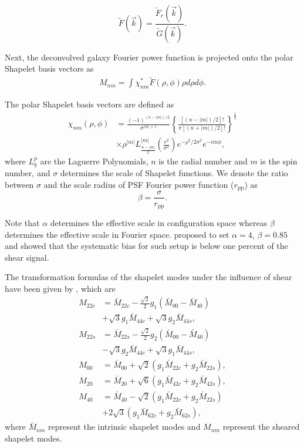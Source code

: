 \documentclass[a4paper,fleqn,usenatbib]{mnras}
\begin{document}
\begin{equation}\label{PSF deconvolution_fourier}
\tilde{F}(\vec{k})=\frac{\tilde{F}_r(\vec{k})}{\tilde{G}(\vec{k})}.
\end{equation}

Next, the deconvolved galaxy Fourier power function is projected onto the polar
Shapelet basis vectors \citep{polar_Shapelets} as
\begin{align}\label{Shapelets_decompose}
M_{nm}=\int \chi_{nm}^{*} \tilde{F}(\rho,\phi) \rho d\rho d\phi.
\end{align}

The polar Shapelet basis vectors are defined as
\begin{align*}
\chi_{nm}(\rho,\phi)&=\frac{(-1)^{(n-|m|)/2}}{\sigma^{|m|+1}}\left\lbrace
    \frac{[(n-|m|)/2]!}{\pi[(n+|m|)/2]!}\right\rbrace^\frac{1}{2}\\
    &\times
    \rho^{|m|}L^{|m|}_{\frac{n-|m|}{2}}\left(\frac{r^2}{\sigma^2}\right)e^{-\rho^2/2\sigma^2}
    e^{-im\phi},
\end{align*}
where $L^{p}_{q}$ are the Laguerre Polynomials, $n$ is the radial number and
$m$ is the spin number, and $\sigma$ determines the scale of Shapelet
functions. We denote the ratio between $\sigma$ and the scale radius of PSF
Fourier power function ($r_{\text{pp}}$) as \citep{Li18FPFS}
\begin{equation}
\beta=\frac{\sigma}{r_{\text{pp}}}.
\end{equation}

Note that $\alpha$ determines the effective scale in configuration space
whereas $\beta$ determines the effective scale in Fourier space.
\citet{Li18FPFS} proposed to set $\alpha=4$, $\beta=0.85$ and showed that the
systematic bias for such setup is below one percent of the shear signal.


The transformation formulas of the shapelet modes under the influence of shear
have been given by \citet{polar_Shapelets}, which are
\begin{equation}\label{Shapelets_Moments_shear_Transform}
\begin{split}
M_{22c}&=\bar{M}_{22c}-\frac{\sqrt{2}}{2}g_1(\bar{M}_{00}-\bar{M}_{40})\\
&+\sqrt{3}g_1 \bar{M}_{44c}+\sqrt{3} g_2 \bar{M}_{44s},\\
M_{22s}&=\bar{M}_{22s}-\frac{\sqrt{2}}{2}g_2(\bar{M}_{00}-\bar{M}_{40})\\
&-\sqrt{3}g_2 \bar{M}_{44c}+\sqrt{3} g_1 \bar{M}_{44s},\\
M_{00} &=\bar{M}_{00}+\sqrt{2}(g_1\bar{M}_{22c}+g_2\bar{M}_{22s}),\\
M_{20} &=\bar{M}_{20}+\sqrt{6}(g_1\bar{M}_{42c}+g_2\bar{M}_{42s}),\\
M_{40} &=\bar{M}_{40}-\sqrt{2}(g_1\bar{M}_{22c}+g_2\bar{M}_{22s})\\
&+2\sqrt{3}(g_1\bar{M}_{62c}+g_2\bar{M}_{62s}),
\end{split}
\end{equation}
where $\bar{M}_{nm}$ represent the intrinsic shapelet modes and $M_{nm}$
represent the sheared shapelet modes.
\end{document}
